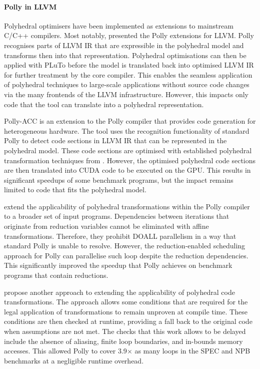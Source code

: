     \paragraph*{Polly in LLVM}
    Polyhedral optimisers have been implemented as extensions to mainstream
    C/C++ compilers.
    Most notably, \citet{Lengauer2012Polly} presented the Polly extensions for
    LLVM.
    Polly recognises parts of LLVM IR that are expressible in the polyhedral
    model and transforms then into that representation.
    Polyhedral optimisations can then be applied with PLuTo
    \citep{Bondhugula:2008:PAP:1375581.1375595} before the model is
    translated back into optimised LLVM IR for further treatment by the core
    compiler.
    This enables the seamless application of polyhedral techniques to
    large-scale applications without source code changes via the many
    frontends of the LLVM infrastructure.
    However, this impacts only code that the tool can translate
    into a polyhedral representation.

    Polly-ACC \citep{polly-acc} is an extension to the Polly compiler that
    provides code generation for heterogeneous hardware.
    The tool uses the recognition functionality of standard Polly to detect
    code sections in LLVM IR that can be represented in the polyhedral model.
    These code sections are optimised with established polyhedral
    transformation techniques from \citet{Lengauer2012Polly}.
    However, the optimised polyhedral code sections are then translated into
    CUDA code to be executed on the GPU.
    This results in significant speedups of some benchmark programs, but the
    impact remains limited to code that fits the polyhedral model.

    \citet{Doerfert2015Polly} extend the applicability of polyhedral
    transformations within the Polly compiler to a broader set of input
    programs.
    Dependencies between iterations that originate from reduction variables
    cannot be eliminated with affine transformations.
    Therefore, they prohibit DOALL parallelism in a way that standard Polly is
    unable to resolve.
    However, the reduction-enabled scheduling approach for Polly can parallelise
    such loop despite the reduction dependencies.
    This significantly improved the speedup that Polly achieves on benchmark
    programs that contain reductions.

    \citet{Doerfert:2017:OLO:3049832.3049864} propose another approach to
    extending the applicability of polyhedral code transformations.
    The approach allows some conditions that are required for the legal
    application of transformations to remain unproven at compile time.
    These conditions are then checked at runtime, providing a fall back to the
    original code when assumptions are not met.
    The checks that this work allows to be delayed include the absence of
    aliasing, finite loop boundaries, and in-bounds memory accesses.
    This allowed Polly to cover 3.9$\times$ as many loops in the SPEC and NPB
    benchmarks at a negligible runtime overhead.

